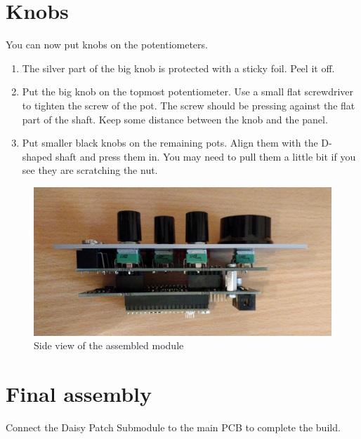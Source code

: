 \documentclass[10pt,a4paper,twocolumn]{article}
\begin{document}
\clearpage

\section{Knobs}

You can now put knobs on the potentiometers.

\begin{enumerate}
  \item The silver part of the big knob is protected with a sticky foil. Peel it off.
  \item Put the big knob on the topmost potentiometer. Use a small flat screwdriver to tighten the screw of the pot. The screw should be pressing against the flat part of the shaft. Keep some distance between the knob and the panel.
  \item Put smaller black knobs on the remaining pots. Align them with the D-shaped shaft and press them in. You may need to pull them a little bit if you see they are scratching the nut.
\end{enumerate}

\begin{figure}[p]
  \centering
  \includegraphics[width=\linewidth]{p11.jpg}
  \caption{Side view of the assembled module}
\end{figure}

\section{Final assembly}

Connect the Daisy Patch Submodule to the main PCB to complete the build.
\end{document}
